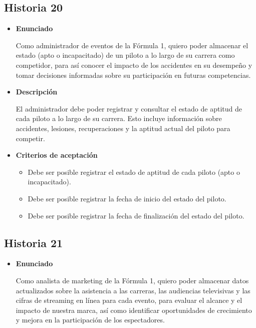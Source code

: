 \documentclass{article}
\begin{document}
	\subsection{Historia 20}
	\begin{itemize}
		
		\item \large{\textbf{Enunciado}}
		\begin{description}
Como administrador de eventos de la Fórmula 1, quiero poder almacenar el estado (apto o incapacitado) de un piloto a lo largo de su carrera como competidor, para así conocer el impacto de los accidentes en su desempeño y tomar decisiones informadas sobre su participación en futuras competencias.

		\end{description}
		
		\item \large{\textbf{Descripción}}
		\begin{description}
El administrador debe poder registrar y consultar el estado de aptitud de cada piloto a lo largo de su carrera. Esto incluye información sobre accidentes, lesiones, recuperaciones y la aptitud actual del piloto para competir.

		\end{description}
		
		\item \large{\textbf{Criterios de aceptación}}
		\begin{itemize}
			\item Debe ser posible registrar el estado de aptitud de cada piloto (apto o incapacitado). 
			\item Debe ser posible registrar la fecha de inicio del estado del piloto.
			\item Debe ser posible registrar la fecha de finalización del estado del piloto.
			
		\end{itemize}
		
	\end{itemize}
	
	\subsection{Historia 21}
	\begin{itemize}
		
		\item \large{\textbf{Enunciado}}
		\begin{description}
			Como analista de marketing de la Fórmula 1, quiero poder almacenar datos actualizados sobre la asistencia a las carreras, las audiencias televisivas y las cifras de streaming en línea para cada evento, para  evaluar el alcance y el impacto de nuestra marca, así como identificar oportunidades de crecimiento y mejora en la participación de los espectadores.
			
		\end{description}
		
		
	\end{itemize}
	
\end{document}
